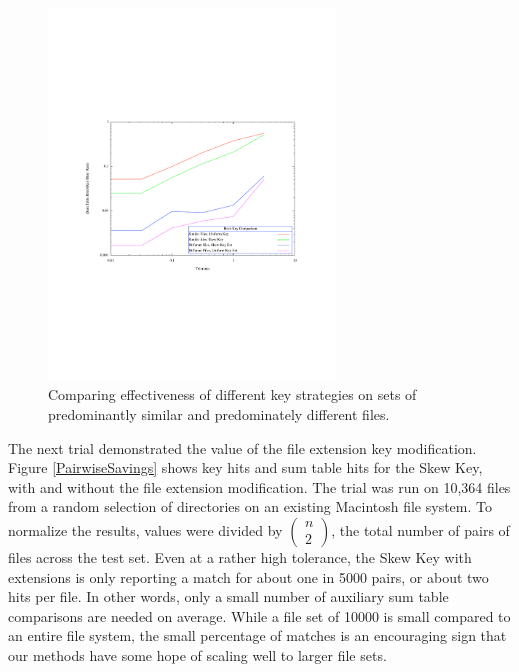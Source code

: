 \documentclass[10pt, twocolumn]{article}
\begin{document}
 \begin{figure}[t] 
 \centering
\includegraphics[width= 3in]{ratioSimDiff.pdf}
\caption{Comparing effectiveness of different key strategies on sets of predominantly similar and predominately different files.}
\label{simdiff} 
\end{figure}   

The next trial demonstrated the value of the file extension key modification.  Figure \ref{PairwiseSavings} shows key hits and sum table hits for the Skew Key, with and without the file extension modification.  The trial was run on 10,364 files from a random selection of directories on an existing Macintosh file system.  To normalize the results, values were divided by $\left( \begin{array}{c} n \\ 2 \end{array} \right)$, the total number of pairs of files across the test set.  Even at a rather high tolerance, the Skew Key with extensions is only reporting a match for about one in 5000 pairs, or about two hits per file. In other words, only a small number of auxiliary sum table comparisons are needed on average.  While a file set of 10000 is small compared to an entire file system, the small percentage of matches is an encouraging sign that our methods have some hope of scaling well to larger file sets.
\end{document}
